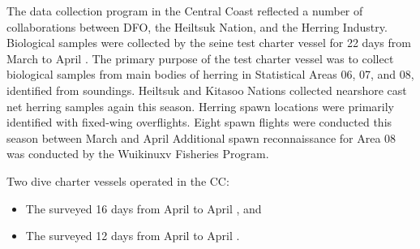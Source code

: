The data collection program in the Central Coast reflected
a number of collaborations between
DFO, the Heiltsuk Nation, and the Herring Industry.
Biological samples were collected by the seine test charter vessel
 for 22 days from March  to April .
The primary purpose of the test charter vessel was to
collect biological samples from main bodies of herring
in Statistical Areas 06, 07, and 08, identified from soundings.
Heiltsuk and Kitasoo Nations collected nearshore
cast net herring samples again this season.
Herring spawn locations were primarily identified with fixed-wing overflights.
Eight spawn flights were conducted this season between
March  and April 
Additional spawn reconnaissance for Area 08 was conducted
by the Wuikinuxv Fisheries Program.

Two dive charter vessels operated in the CC:

\begin{itemize}

\item The  surveyed 16 days from April  to April , and

\item The  surveyed 12 days from April  to April .

\end{itemize}